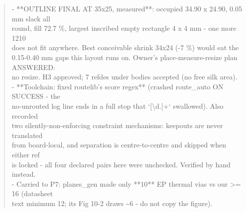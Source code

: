 \documentclass[11pt,a4paper]{article}
\begin{document}
\begin{quote}
- {*}{*}OUTLINE FINAL AT 35x25, measured{*}{*}: occupied 34.90 x 24.90, 0.05 mm slack all\\
  round, fill 72.7 \%, largest inscribed empty rectangle 4 x 4 mm - one more 1210\\
  does not fit anywhere. Best conceivable shrink 34x24 (-7 \%) would eat the\\
  0.15-0.40 mm gaps this layout runs on. Owner's place-measure-resize plan ANSWERED:\\
  no resize. H3 approved; 7 refdes under bodies accepted (no free silk area).\\
- {*}{*}Toolchain: fixed routelib's score regex{*}{*} (crashed route\_auto ON SUCCESS - the\\
  no-unrouted log line ends in a full stop that `{[}\textbackslash{}d.{]}+` swallowed). Also recorded\\
  two silently-non-enforcing constraint mechanisms: keepouts are never translated\\
  from board-local, and separation is centre-to-centre and skipped when either ref\\
  is locked - all four declared pairs here were unchecked. Verified by hand instead.\\
- Carried to P7: planes\_gen made only {*}{*}10{*}{*} EP thermal vias vs our \textgreater{}= 16 (datasheet\\
  text minimum 12; its Fig 10-2 draws \textasciitilde{}6 - do not copy the figure).
\end{quote}
\end{document}
